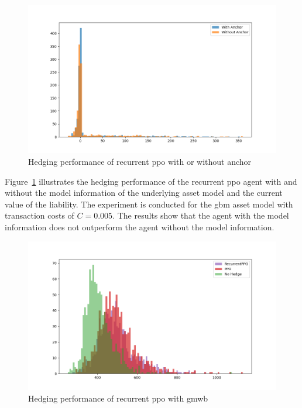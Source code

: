 \begin{figure}[ht!]
    \centering
    \includegraphics[width=\textwidth]{./futureWork/figures/PPO_anchor.png}
    \caption{Hedging performance of recurrent \gls{ppo} with or without anchor}
    \label{fig3:ppo_anchor}
\end{figure}

Figure~\ref{fig3:ppo_anchor} illustrates the hedging performance of the recurrent \gls{ppo} agent with and without the model information of the underlying asset model and the current value of the liability.
The experiment is conducted for the \gls{gbm} asset model with transaction costs of $C=0.005$.
The results show that the agent with the model information does not outperform the agent without the model information.


\begin{figure}[ht!]
    \centering
    \includegraphics[width=\textwidth]{./futureWork/figures/PPO_GMWB.png}
    \caption{Hedging performance of recurrent \gls{ppo} with \gls{gmwb}}
    \label{fig3:ppo_GMWB}
\end{figure}

